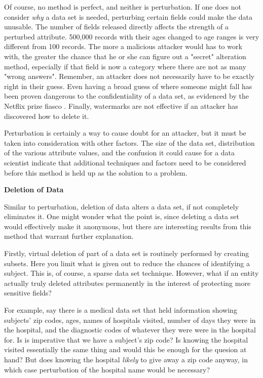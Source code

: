 \documentclass[10pt,journal,compsoc]{IEEEtran}
\begin{document}
	Of course, no method is perfect, and neither is perturbation.  If one does not consider \textit{why} a data set is needed, perturbing certain fields could make the data unusable.  The number of fields released directly affects the strength of a perturbed attribute.  500,000 records with their ages changed to age ranges is very different from 100 records.  The more a malicious attacker would has to work with, the greater the chance that he or she can figure out a "secret" alteration method, especially if that field is now a category where there are not as many "wrong answers".  Remember, an attacker does not necessarily have to be exactly right in their guess.  Even having a broad guess of where someone might fall has been proven dangerous to the confidentiality of a data set, as evidenced by the Netflix prize fiasco \cite{narayanan}.  Finally, watermarks are not effective if an attacker has discovered how to delete it.  
	
	Perturbation is certainly a way to cause doubt for an attacker, but it must be taken into consideration with other factors.  The size of the data set, distribution of the various attribute values, and the confusion it could cause for a data scientist indicate that additional techniques and factors need to be considered before this method is held up as the solution to a problem.\linebreak

\noindent \textbf{Deletion of Data}

	Similar to perturbation, deletion of data alters a data set, if not completely eliminates it.  One might wonder what the point is, since deleting a data set would effectively make it anonymous, but there are interesting results from this method that warrant further explanation.
	
	Firstly, virtual deletion of part of a data set is routinely performed by creating subsets. Here you limit what is given out to reduce the chances of identifying a subject.  This is, of course, a sparse data set technique.  However, what if an entity actually truly deleted attributes permanently in the interest of protecting more sensitive fields?  
	
	For example, say there is a medical data set that held information showing subjects' zip codes, ages, names of hospitals visited,  number of days they were in the hospital, and the diagnostic codes of whatever they were were in the hospital for.  Is is imperative that we have a subject's zip code?  Is knowing the hospital visited essentially the same thing and would this be enough for the quesion at hand?  But does knowing the hospital \textit{likely} to give away a zip code anyway, in which case perturbation of the hospital name would be necessary?
	
\end{document}

